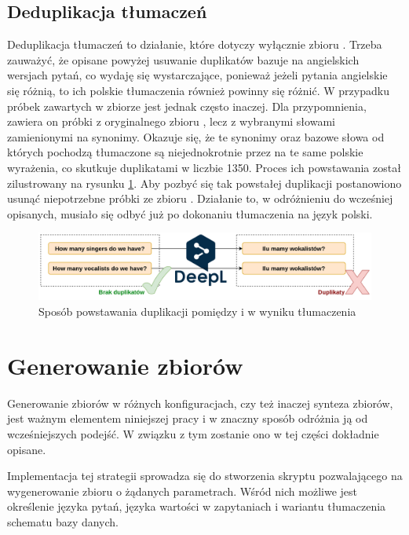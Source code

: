 \subsection{Deduplikacja tłumaczeń}
Deduplikacja tłumaczeń to działanie, które dotyczy wyłącznie zbioru . Trzeba zauważyć, że opisane powyżej usuwanie duplikatów bazuje na angielskich wersjach pytań, co wydaję się wystarczające, ponieważ jeżeli pytania angielskie się różnią, to ich polskie tłumaczenia również powinny się różnić. W przypadku próbek zawartych w zbiorze  jest jednak często inaczej. Dla przypomnienia, zawiera on próbki z oryginalnego zbioru , lecz z wybranymi słowami zamienionymi na synonimy. Okazuje się, że te synonimy oraz bazowe słowa od których pochodzą tłumaczone są niejednokrotnie przez  na te same polskie wyrażenia, co skutkuje duplikatami w liczbie 1350. Proces ich powstawania został zilustrowany na rysunku \ref{fig:deduplication-after-translation}. Aby pozbyć się tak powstałej duplikacji postanowiono usunąć niepotrzebne próbki ze zbioru . Działanie to, w odróżnieniu do wcześniej opisanych, musiało się odbyć już po dokonaniu tłumaczenia na język polski.

\begin{figure}[ht!]
  \centering
  \includegraphics[width=1.0\linewidth]{images/duplication_after_translation.png}
  \caption{Sposób powstawania duplikacji pomiędzy  i  w wyniku tłumaczenia}
  \label{fig:deduplication-after-translation}
\end{figure}

\section{Generowanie zbiorów}
Generowanie zbiorów w różnych konfiguracjach, czy też inaczej synteza zbiorów, jest ważnym elementem niniejszej pracy i w znaczny sposób odróżnia ją od wcześniejszych podejść. W związku z tym zostanie ono w tej części dokładnie opisane.

Implementacja tej strategii sprowadza się do stworzenia skryptu pozwalającego na wygenerowanie zbioru o żądanych parametrach. Wśród nich możliwe jest określenie języka pytań, języka wartości w zapytaniach i wariantu tłumaczenia schematu bazy danych.

